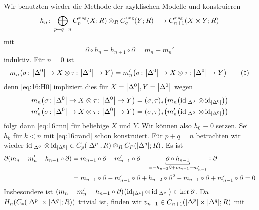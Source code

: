 \begin{beweis}
	Wir benutzten wieder die Methode der azyklischen Modelle und konstruieren 
	\[
		h_n \colon \bigoplus_{p+q=n} C^\sing_p(X;R) \otimes_R C^\sing_q(Y;R) \longrightarrow C_{n+1}^\sing(X \times Y;R)
	\]
	mit 
	\begin{equation}
		\partial \circ h_n + h_{n+1} \circ \partial=m_n -m_n' \label{eq:16:rand} \tag{\#}
	\end{equation}
	induktiv. Für $n=0$ ist 
	\begin{equation}
		m_n \enbrace*{\sigma \colon \abs*{\Delta^0} \to X \otimes \tau \colon \abs*{\Delta^0} \to Y  } = m_n' \enbrace*{\sigma \colon \abs*{\Delta^0} \to X \otimes \tau \colon \abs*{\Delta^0} \to Y  } \label{eq:16:mn}\tag{\ddag}
	\end{equation}
	denn \eqref{eq:16:H0} impliziert dies für $X=\abs*{\Delta^0}, Y=\abs*{\Delta^0}$ wegen
	\begin{align}
		m_n \enbrace*{\sigma \colon \abs*{\Delta^0} \to X \otimes \tau \colon \abs*{\Delta^0} \to Y} &= (\sigma,\tau)_* \enbrace*{m_n \enbrace*{\id_{\abs*{\Delta^0} } \otimes \id_{\abs*{\Delta^0} }}}\\
		m_n' \enbrace*{\sigma \colon \abs*{\Delta^0} \to X \otimes \tau \colon \abs*{\Delta^0} \to Y} &= (\sigma,\tau)_* \enbrace*{m_n' \enbrace*{\id_{\abs*{\Delta^0} } \otimes \id_{\abs*{\Delta^0} }}}
	\end{align}
	folgt dann \eqref{eq:16:mn} für beliebige $X$ und $Y$.
	Wir können also $h_0 \equiv 0$ setzen.
	Sei $h_k$ für $k < n$ mit \eqref{eq:16:rand} schon konstruiert.
	Für $p+q=n$ betrachten wir wieder $\id_{\abs*{\Delta^0}} \otimes \id_{\abs*{\Delta^0}} \in C_p \enbrace*{\abs*{\Delta^p};R} \otimes_R C_P \enbrace*{\abs*{\Delta^q};R }$.
	Es ist 
	\begin{align}
		\partial \enbrace*{m_n -m'_n - h_{n-1} \circ \partial} &= m_{n-1} \circ \partial -m_{n-1}' \circ \partial - \Underbracket{\partial \circ h_{n-1}}{= - h_{n-2} \partial + m_{n-1} - m_{n-1}'} \circ \partial \\
		&= m_{n-1} \circ \partial - m_{n-1}' \circ \partial + h_{n-2} \circ \partial^2 - m_{n-1} \circ \partial + m_{n-1}' \circ \partial =0
	\end{align}
	Insbesondere ist $\enbrace*{m_n -m_n' - h_{n-1} \circ \partial} \enbrace*{\id_{\abs*{\Delta^p}} \otimes \id_{\abs*{\Delta^q} }} \in \ker \partial$.
	Da $H_n \enbrace*{C_* \enbrace*{\abs*{\Delta^p} \times \abs*{\Delta^q};R} }$ trivial ist, finden wir $v_{n+1} \in C_{n+1} \enbrace*{\abs*{\Delta^p} \times \abs*{\Delta^q};R}$ mit 

\end{beweis}
